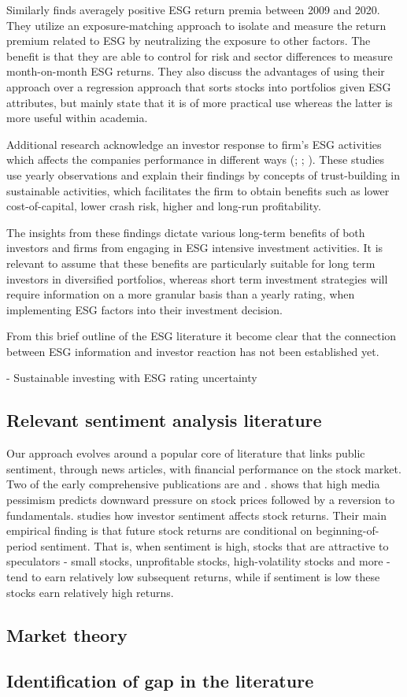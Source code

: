 Similarly \cite{ESG_exposure_approach} finds averagely positive ESG return premia between 2009 and 2020. They utilize an exposure-matching approach to isolate and measure the return premium related to ESG by neutralizing the exposure to other factors. The benefit is that they are able to control for risk and sector differences to measure month-on-month ESG returns. They also discuss the advantages of using their approach over a regression approach that sorts stocks into portfolios given ESG attributes, but mainly state that it is of more practical use whereas the latter is more useful within academia.

Additional research acknowledge an investor response to firm's ESG activities which affects the companies performance in different ways (\cite{lins2017social}; \cite{kim2014corporate}; \cite{el2011does}). These studies use yearly observations and explain their findings by concepts of trust-building in sustainable activities, which facilitates the firm to obtain benefits such as lower cost-of-capital, lower crash risk, higher and long-run profitability.

The insights from these findings dictate various long-term benefits of both investors and firms from engaging in ESG intensive investment activities. It is relevant to assume that these benefits are particularly suitable for long term investors in diversified portfolios, whereas short term investment strategies will require information on a more granular basis than a yearly rating, when implementing ESG factors into their investment decision. 


From this brief outline of the ESG literature it become clear that the connection between ESG information and investor reaction has not been established yet. 


- Sustainable investing with ESG rating uncertainty


\subsection{Relevant sentiment analysis literature}

Our approach evolves around a popular core of literature that links public sentiment, through news articles, with financial performance on the stock market. Two of the early comprehensive publications are \cite{tetlock_sentiment} and \cite{baker_sentiment}. \citeauthor{tetlock_sentiment} shows that high media pessimism predicts downward pressure on stock prices followed by a reversion to fundamentals. \citeauthor{baker_sentiment} studies how investor sentiment affects stock returns. Their main empirical finding is that future stock returns are conditional on beginning-of-period sentiment. That is, when sentiment is high, stocks that are attractive to speculators - small stocks, unprofitable stocks, high-volatility stocks and more - tend to earn relatively low subsequent returns, while if sentiment is low these stocks earn relatively high returns.   




\subsection{Market theory}




\subsection{Identification of gap in the literature}

